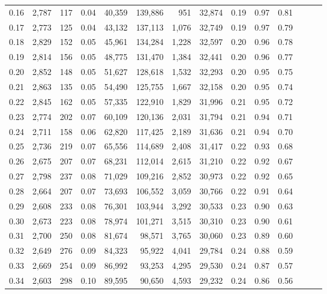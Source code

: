 \begin{tabular}{rrrrrrrrrrrrrr}
0.16 &  2,787 &  117 &  0.04 &   40,359 &  139,886 &     951 &  32,874 &  0.19 &  0.97 &      0.81 \\
0.17 &  2,773 &  125 &  0.04 &   43,132 &  137,113 &   1,076 &  32,749 &  0.19 &  0.97 &      0.79 \\
0.18 &  2,829 &  152 &  0.05 &   45,961 &  134,284 &   1,228 &  32,597 &  0.20 &  0.96 &      0.78 \\
0.19 &  2,814 &  156 &  0.05 &   48,775 &  131,470 &   1,384 &  32,441 &  0.20 &  0.96 &      0.77 \\
0.20 &  2,852 &  148 &  0.05 &   51,627 &  128,618 &   1,532 &  32,293 &  0.20 &  0.95 &      0.75 \\
0.21 &  2,863 &  135 &  0.05 &   54,490 &  125,755 &   1,667 &  32,158 &  0.20 &  0.95 &      0.74 \\
0.22 &  2,845 &  162 &  0.05 &   57,335 &  122,910 &   1,829 &  31,996 &  0.21 &  0.95 &      0.72 \\
0.23 &  2,774 &  202 &  0.07 &   60,109 &  120,136 &   2,031 &  31,794 &  0.21 &  0.94 &      0.71 \\
0.24 &  2,711 &  158 &  0.06 &   62,820 &  117,425 &   2,189 &  31,636 &  0.21 &  0.94 &      0.70 \\
0.25 &  2,736 &  219 &  0.07 &   65,556 &  114,689 &   2,408 &  31,417 &  0.22 &  0.93 &      0.68 \\
0.26 &  2,675 &  207 &  0.07 &   68,231 &  112,014 &   2,615 &  31,210 &  0.22 &  0.92 &      0.67 \\
0.27 &  2,798 &  237 &  0.08 &   71,029 &  109,216 &   2,852 &  30,973 &  0.22 &  0.92 &      0.65 \\
0.28 &  2,664 &  207 &  0.07 &   73,693 &  106,552 &   3,059 &  30,766 &  0.22 &  0.91 &      0.64 \\
0.29 &  2,608 &  233 &  0.08 &   76,301 &  103,944 &   3,292 &  30,533 &  0.23 &  0.90 &      0.63 \\
0.30 &  2,673 &  223 &  0.08 &   78,974 &  101,271 &   3,515 &  30,310 &  0.23 &  0.90 &      0.61 \\
0.31 &  2,700 &  250 &  0.08 &   81,674 &   98,571 &   3,765 &  30,060 &  0.23 &  0.89 &      0.60 \\
0.32 &  2,649 &  276 &  0.09 &   84,323 &   95,922 &   4,041 &  29,784 &  0.24 &  0.88 &      0.59 \\
0.33 &  2,669 &  254 &  0.09 &   86,992 &   93,253 &   4,295 &  29,530 &  0.24 &  0.87 &      0.57 \\
0.34 &  2,603 &  298 &  0.10 &   89,595 &   90,650 &   4,593 &  29,232 &  0.24 &  0.86 &      0.56 \\

\end{tabular}
